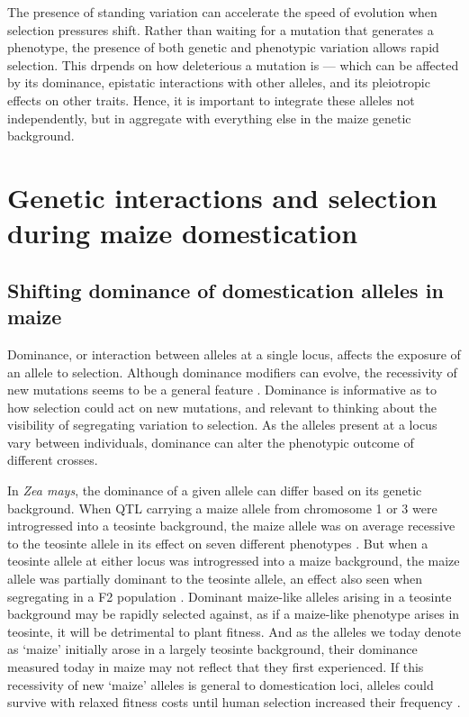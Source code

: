 \documentclass[9pt,twocolumn,twoside]{rilabRxiv}
\begin{document}
﻿The presence of standing variation can accelerate the speed of evolution when selection pressures shift.
Rather than waiting for a mutation that generates a phenotype, the presence of both genetic and phenotypic variation allows rapid selection.
This drpends on how deleterious a mutation is --- which can be affected by its dominance, epistatic interactions with other alleles, and its pleiotropic effects on other traits.
Hence, it is important to integrate these alleles not independently, but in aggregate with everything else in the maize genetic background. 
﻿
\section*{Genetic interactions and selection during maize domestication}
\subsection*{Shifting dominance of domestication alleles in maize}

﻿Dominance, or interaction between alleles at a single locus, affects the exposure of an allele to selection.
Although dominance modifiers can evolve, the recessivity of new mutations seems to be a general feature \citep{orr1991}.
﻿Dominance is informative as to how selection could act on new mutations, and relevant to thinking about the visibility of segregating variation to selection.
﻿As the alleles present at a locus vary between individuals, dominance can alter the phenotypic outcome of different crosses.

﻿In \textit{Zea mays}, the dominance of a given allele can differ based on its genetic background.
When QTL carrying a maize allele from chromosome 1 or 3 were introgressed into a teosinte background, the maize allele was on average recessive to the teosinte allele in its effect on seven different phenotypes \citep{doebley1995}.
﻿But when a teosinte allele at either locus was introgressed into a maize background, the maize allele was partially dominant to the teosinte allele, an effect also seen when segregating in a F2 population \citep{doebley1995}.
Dominant maize-like alleles arising in a teosinte background may be rapidly selected against, as if a maize-like phenotype arises in teosinte, it will be detrimental to plant fitness.
And as the alleles we today denote as `maize' initially arose in a largely teosinte background, their dominance measured today in maize  may not reflect that they first experienced.
﻿If this recessivity of new `maize' alleles is general to domestication loci, alleles could survive with relaxed fitness costs until human selection increased their frequency \citep{doebley1995, lauter2002}.
\end{document}

